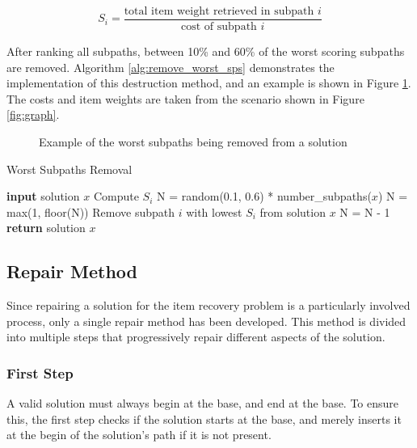 \documentclass[conference]{IEEEtran}
\begin{document}
\begin{equation}\label{eq:remove_worst_sps}
S_i = \frac{\text{total item weight retrieved in subpath } i}{\text{cost of subpath }i}
\end{equation}

After ranking all subpaths, between 10\% and 60\% of the worst scoring subpaths are removed. Algorithm \ref{alg:remove_worst_sps} demonstrates the implementation of this destruction method, and an example is shown in Figure \ref{fig:remove_worst_sps}. The costs and item weights are taken from the scenario shown in Figure \ref{fig:graph}.

\begin{figure}[h]
  	  \centering
  	  
      \caption{Example of the worst subpaths being removed from a solution}
      \label{fig:remove_worst_sps}
\end{figure}

\begin{algorithm}[h]
\caption{Worst Subpaths Removal}
\label{alg:remove_worst_sps}
\begin{algorithmic}[1]
\State \textbf{input} solution $x$
\State Compute $S_i$
\EndFor
\State N = random(0.1, 0.6) * number\_subpaths($x$)
\State N = max(1, floor(N))
\State Remove subpath $i$ with lowest $S_i$ from solution $x$
\State N = N - 1
\EndWhile
\State \textbf{return} solution $x$
\end{algorithmic}
\end{algorithm}


\subsection{Repair Method}

Since repairing a solution for the item recovery problem is a particularly involved process, only a single repair method has been developed. This method is divided into multiple steps that progressively repair different aspects of the solution.

\subsubsection{First Step}

A valid solution must always begin at the base, and end at the base. To ensure this, the first step checks if the solution starts at the base, and merely inserts it at the begin of the solution's path if it is not present.
\end{document}
